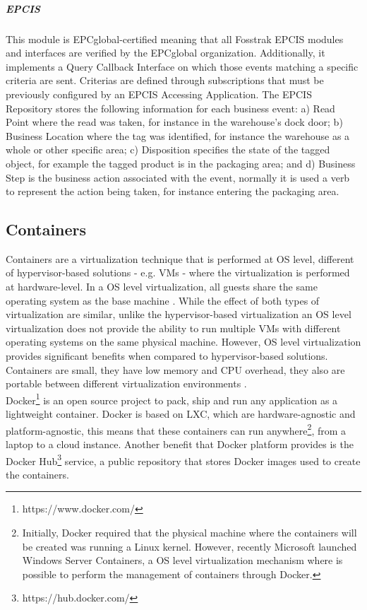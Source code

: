 \subparagraph{EPCIS}
This module is EPCglobal-certified meaning that all Fosstrak EPCIS modules and interfaces are
verified by the EPCglobal organization. Additionally, it implements a Query Callback Interface on which
those events matching a specific criteria are sent. Criterias are defined through subscriptions that
must be previously configured by an EPCIS Accessing Application. The EPCIS Repository stores the following
information for each business event: a) Read Point where the read was taken, for instance in the warehouse’s
dock door; b) Business Location where the tag was identified, for instance the warehouse as a whole or other
specific area; c) Disposition specifies the state of the tagged object, for example the tagged product is
in the packaging area; and d) Business Step is the business action associated with the event, normally it
is used a verb to represent the action being taken, for instance entering the packaging area.

\subsection{Containers}
\label{sub:containers}
Containers are a virtualization technique that is performed at \gls{OS} level, different of
hypervisor-based solutions - e.g. \glspl{VM} - where the virtualization is performed at hardware-level.
In a \gls{OS} level virtualization, all guests share the same operating system as the base machine \cite{matthews2007quantifying}.
While the effect of both types of virtualization are similar, unlike the hypervisor-based virtualization
an \gls{OS} level virtualization does not provide the ability to run multiple \glspl{VM} with different
operating systems on the same physical machine. However, \gls{OS} level virtualization provides significant
benefits when compared to hypervisor-based solutions. Containers are small, they have low memory and
\gls{CPU} overhead, they also are portable between different virtualization environments \cite{soltesz2007container}.\\

Docker\footnote{https://www.docker.com/} is an open source project to pack, ship and run any application as
a lightweight container. Docker is based on \gls{LXC}, which are hardware-agnostic and platform-agnostic,
this means that these containers can run anywhere\footnote{Initially, Docker required that the physical
machine where the containers will be created was running a Linux kernel. However, recently Microsoft
launched Windows Server Containers, a \gls{OS} level virtualization mechanism where is possible to
perform the management of containers through Docker.}, from a laptop to a cloud instance. Another
benefit that Docker platform provides is the Docker Hub\footnote{https://hub.docker.com/} service,
a public repository that stores Docker images used to create the containers.


